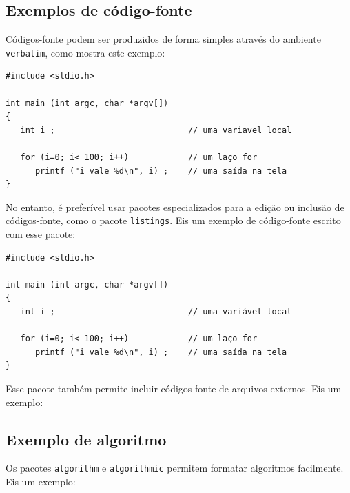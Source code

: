 
\subsection{Exemplos de código-fonte}

Códigos-fonte podem ser produzidos de forma simples através do ambiente \texttt{verbatim}, como mostra este exemplo:

\begin{footnotesize}
\begin{verbatim}
#include <stdio.h>

int main (int argc, char *argv[])
{
   int i ;                           // uma variavel local

   for (i=0; i< 100; i++)            // um laço for
      printf ("i vale %d\n", i) ;    // uma saída na tela
}
\end{verbatim}
\end{footnotesize}

No entanto, é preferível usar pacotes especializados para a edição ou inclusão de códigos-fonte, como o pacote \texttt{listings}. Eis um exemplo de código-fonte escrito com esse pacote:


\begin{lstlisting}
#include <stdio.h>

int main (int argc, char *argv[])
{
   int i ;                           // uma variável local

   for (i=0; i< 100; i++)            // um laço for
      printf ("i vale %d\n", i) ;    // uma saída na tela
}
\end{lstlisting}

Esse pacote também permite incluir códigos-fonte de arquivos externos. Eis um exemplo:





\subsection{Exemplo de algoritmo}

Os pacotes \texttt{algorithm} e \texttt{algorithmic} permitem formatar algoritmos facilmente. Eis um exemplo:

